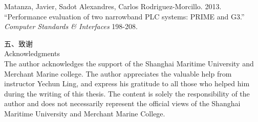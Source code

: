 \documentclass[a4paper]{article}
\renewcommand{\Large}{\fontsize{12pt}{\baselineskip}\selectfont}
\begin{document}
\setlength{\hangindent}{4em}
Matanza, Javier, Sadot Alexandres, Carlos Rodriguez-Morcillo. 2013. ``Performance evaluation of two narrowband PLC systems: PRIME and G3.''
\textit{Computer Standards \& Interfaces} 198-208. \par

{ \Large 五、致谢} \\
{ \Large Acknowledgments} \\
The author acknowledges the support of the Shanghai Maritime
University and Merchant Marine college. The author appreciates the valuable
help from instructor Yechun Ling, and express his gratitude to all those who helped him
during the writing of this thesis. The content is solely the responsibility of the author and
does not necessarily represent the official views of the Shanghai Maritime University
and Merchant Marine College.
\end{document}

